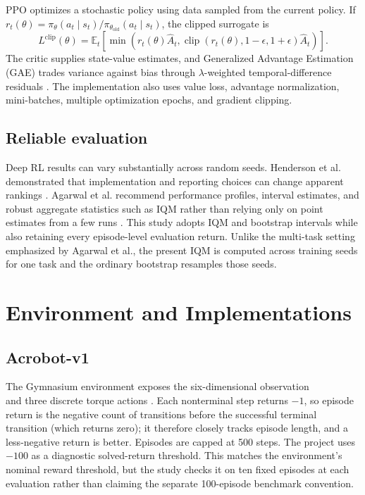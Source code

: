 \documentclass[11pt]{article}
\begin{document}
PPO optimizes a stochastic policy using data sampled from the current policy. If
$r_t(\theta)=\pi_\theta(a_t\mid s_t)/\pi_{\theta_{\mathrm{old}}}(a_t\mid s_t)$,
the clipped surrogate is \citep{schulman2017ppo}
\begin{equation}
L^{\mathrm{clip}}(\theta)=\mathbb{E}_t\!\left[
\min\!\left(r_t(\theta)\hat A_t,
\operatorname{clip}(r_t(\theta),1-\epsilon,1+\epsilon)\hat A_t\right)
\right].
\label{eq:ppo}
\end{equation}
The critic supplies state-value estimates, and Generalized Advantage Estimation
(GAE) trades variance against bias through $\lambda$-weighted temporal-difference
residuals \citep{schulman2016gae}. The implementation also uses value loss,
advantage normalization, mini-batches, multiple optimization epochs, and gradient
clipping.

\subsection{Reliable evaluation}

Deep RL results can vary substantially across random seeds. Henderson et al.
demonstrated that implementation and reporting choices can change apparent
rankings \citep{henderson2018matters}. Agarwal et al. recommend performance
profiles, interval estimates, and robust aggregate statistics such as IQM rather
than relying only on point estimates from a few runs
\citep{agarwal2021precipice}. This study adopts IQM and bootstrap intervals while
also retaining every episode-level evaluation return. Unlike the multi-task
setting emphasized by Agarwal et al., the present IQM is computed across training
seeds for one task and the ordinary bootstrap resamples those seeds.

\section{Environment and Implementations}

\subsection{Acrobot-v1}

The Gymnasium environment exposes the six-dimensional observation
\begin{equation*}
[\cos\theta_1,\ \sin\theta_1,\ \cos\theta_2,\ \sin\theta_2,\
\ \dot\theta_1,\ \dot\theta_2]
\end{equation*}
and three discrete torque actions \citep{gymnasium_acrobot}. Each nonterminal step returns $-1$, so episode return
is the negative count of transitions before the successful terminal transition
(which returns zero); it therefore closely tracks episode length, and a
less-negative return is better. Episodes are capped at 500 steps. The project uses $-100$ as a
diagnostic solved-return threshold. This matches the environment's nominal reward
threshold, but the study checks it on ten fixed episodes at each evaluation rather
than claiming the separate 100-episode benchmark convention.
\end{document}
